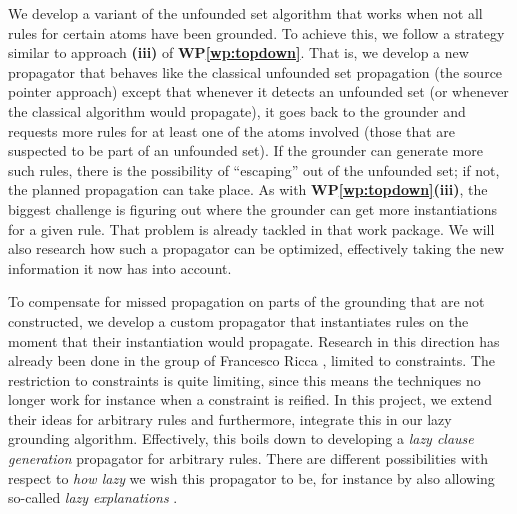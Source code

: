 \documentclass[a4paper,11pt]{article}
\newcommand\WPref[1]{\textbf{WP\ref{#1}}}
\begin{document}
\begin{WP}\label{wp:unfounded}
We develop a variant of the unfounded set algorithm that works when not all rules for certain atoms have been grounded. 
To achieve this, we follow a strategy similar to approach \textbf{(iii)} of \WPref{wp:topdown}. That is, we develop a new propagator that behaves like the classical unfounded set propagation (the source pointer approach) except that whenever it detects an unfounded set (or whenever the classical algorithm would propagate), it goes back to the grounder and requests more rules for at least one of the atoms involved (those that are suspected to be part of an unfounded set). 
If the grounder can generate more such rules, there is the possibility of ``escaping'' out of the unfounded set; if not, the planned propagation can take place. 
As with \textbf{WP\ref{wp:topdown}(iii)}, the biggest challenge is figuring out where the grounder can get more instantiations for a given rule. That problem is already tackled in that work package. 
We will also research how such a propagator can be optimized, effectively taking the new information it now has into account. 
\end{WP}

%  

\begin{WP}\label{wp:improvements:last}\label{wp:watch}
To compensate for missed propagation on parts of the grounding that are not constructed, we  develop a custom propagator that instantiates rules on the moment that their instantiation would propagate. 
Research in this direction has already been done in the group of Francesco Ricca \cite{tplp/CuteriDRS17}, limited to constraints. 
The restriction to constraints is quite limiting, since this means the techniques no longer work for instance when a constraint is reified. 
In this project, we extend their ideas for arbitrary rules and furthermore, integrate this in our lazy grounding algorithm. Effectively, this boils down to developing a \emph{lazy clause generation} propagator for arbitrary rules. There are different possibilities with respect to \emph{how lazy} we wish this propagator to be, for instance by also allowing so-called \emph{lazy explanations} \cite{padl/GentMM10}.
% 
\end{WP}
\end{document}
